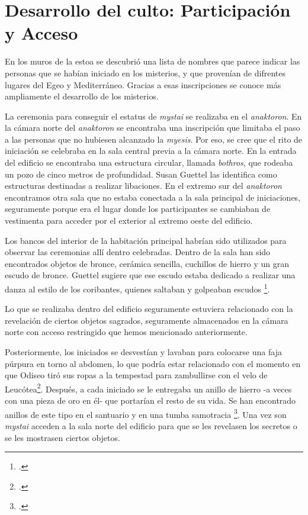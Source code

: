 \section{Desarrollo del culto: Participación y Acceso}

En los muros de la estoa se descubrió una lista de nombres que parece indicar las personas que se habían iniciado en los misterios, y que provenían de difrentes lugares del Egeo y Mediterráneo. Gracias a esas inscripciones se conoce más ampliamente el desarrollo de los misterios.

La ceremonia para conseguir el estatus de \textit{mystai} se realizaba en el \textit{anaktoron}.
En la cámara norte del \textit{anaktoron} se encontraba una inscripción que limitaba el paso a las personas que no hubiesen alcanzado la \textit{myesis}. Por eso, se cree que el rito de iniciación se celebraba en la sala central previa a la cámara norte. 
En la entrada del edificio se encontraba una estructura circular, llamada \textit{bothros}, que rodeaba un pozo de cinco metros de profundidad. Susan Guettel las identifica como estructuras destinadas a realizar libaciones. 
En el extremo sur del \textit{anaktoron} encontramos otra sala que no estaba conectada a la sala principal de iniciaciones, seguramente porque era el lugar donde los participantes se cambiaban de vestimenta para acceder por el exterior al extremo oeste del edificio. 

Los bancos del interior de la habitación principal habrían sido utilizados para observar las ceremonias allí dentro celebradas. Dentro de la sala han sido encontrados objetos de bronce, cerámica sencilla, cuchillos de hierro y un gran escudo de bronce. Guettel sugiere que ese escudo estaba dedicado a realizar una danza al estilo de los coribantes, quienes saltaban y golpeaban escudos \footcite[29]{guettelcoleTheoiMegaloiCult1984}.

Lo que se realizaba dentro del edificio seguramente estuviera relacionado con la revelación de ciertos objetos sagrados, seguramente almacenados en la cámara norte con acceso restringido que hemos mencionado anteriormente. 

Posteriormente, los iniciados se desvestían y lavaban para colocarse una faja púrpura en torno al abdomen, lo que podría estar relacionado con el momento en que Odiseo tiró sus ropas a la tempestad para zambullirse con el velo de Leucótea\footcite[377]{burkertReligionGriegaArcaica2007}. Después, a cada iniciado se le entregaba un anillo de hierro -a veces con una pieza de oro en él- que portarían el resto de su vida. Se han encontrado anillos de este tipo en el santuario y en una tumba samotracia \footcite[30]{guettelcoleTheoiMegaloiCult1984}. Una vez son \textit{mystai} acceden a la sala norte del edificio para que se les revelasen los secretos o se les mostrasen ciertos objetos.

